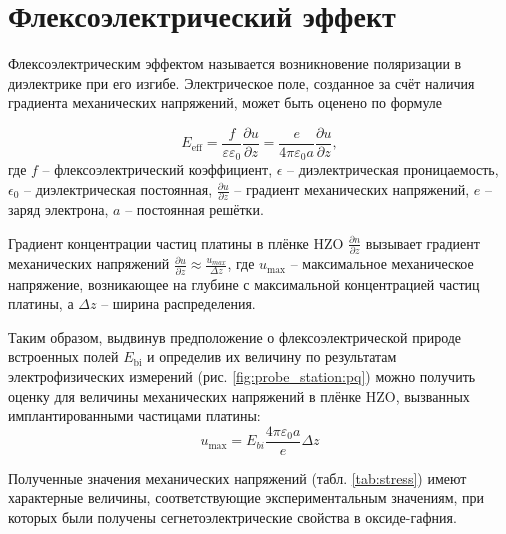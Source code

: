 
\section{Флексоэлектрический эффект}\label{sec:ch3/flexoelectric}

Флексоэлектрическим эффектом называется возникновение поляризации в диэлектрике при его изгибе. Электрическое поле, созданное за счёт наличия градиента механических напряжений, может быть оценено по формуле \cite{gruvermanMechanicalStressEffect2003}

\[E_\text{eff}=\frac{f}{\varepsilon\varepsilon_0}\frac{\partial u}{\partial z} = \frac{e}{4\pi\varepsilon_0 a}\frac{\partial u}{\partial z},\]
где \(f\) -- флексоэлектрический коэффициент, \(\epsilon\) -- диэлектрическая проницаемость, \(\epsilon_0\) -- диэлектрическая постоянная, \(\frac{\partial u}{\partial z}\) -- градиент механических напряжений, \(e\) -- заряд электрона, \(a\) -- постоянная решётки.

Градиент концентрации частиц платины в плёнке HZO \(\frac{\partial n}{\partial z}\) вызывает градиент механических напряжений \(\frac{\partial u}{\partial z}\approx\frac{u_{max}}{\Delta z}\), где \(u_\text{max}\) -- максимальное механическое напряжение, возникающее на глубине с максимальной концентрацией частиц платины, а \(\Delta z\) -- ширина распределения.

Таким образом, выдвинув предположение о флексоэлектрической природе встроенных полей \(E_\text{bi}\) и определив их величину по результатам электрофизических измерений (рис. \cref{fig:probe_station:pq}) можно получить оценку для величины механических напряжений в плёнке HZO, вызванных имплантированными частицами платины:
\[u_\text{max}= E_{bi}\frac{4\pi\varepsilon_0 a}{e}\Delta z\]

Полученные значения механических напряжений (табл. \ref{tab:stress}) имеют характерные величины, соответствующие экспериментальным значениям, при которых были получены сегнетоэлектрические свойства в оксиде-гафния.


